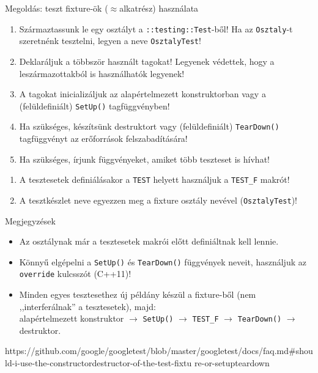 \documentclass[usenames,dvipsnames,aspectratio=169]{beamer}
\newcommand{\kiemel}[1]{{\color{kiemelesszin}#1}}
\begin{document}

\begin{frame}
  Megoldás: teszt \kiemel{fixture}-ök ($\approx$alkatrész) használata
  \begin{enumerate}
    \item Származtassunk le egy osztályt a \texttt{::testing::Test}-ből! Ha az \texttt{Osztaly}-t szeretnénk tesztelni, legyen 
a neve \texttt{OsztalyTest}!
    \item Deklaráljuk a többször használt tagokat! Legyenek védettek, hogy a leszármazottakból is használhatók legyenek!
    \item A tagokat inicializáljuk az alapértelmezett konstruktorban vagy a (felüldefiniált) \texttt{SetUp()} tagfüggvényben!
    \item Ha szükséges, készítsünk destruktort vagy (felüldefiniált) \texttt{TearDown()} tagfüggvényt az 
erőforrások felszabadítására!
    \item Ha szükséges, írjunk függvényeket, amiket több teszteset is hívhat!
    \setcounter{fixtures}{\theenumi}
  \end{enumerate}
\end{frame}

\begin{frame}
  \begin{enumerate}
    \setcounter{enumi}{\thefixtures}
    \item A tesztesetek definiálásakor a \texttt{TEST} helyett használjuk a \texttt{TEST\_F} makrót!
    \item A tesztkészlet neve egyezzen meg a fixture osztály nevével (\texttt{OsztalyTest})!
  \end{enumerate}
  \vfill
  Megjegyzések
  \begin{itemize}
    \item Az osztálynak már a tesztesetek makrói előtt definiáltnak kell lennie.
    \item Könnyű elgépelni a \texttt{SetUp()} és \texttt{TearDown()} függvények neveit, használjuk az \texttt{override} 
kulcsszót (C++11)!
    \item Minden egyes tesztesethez új példány készül a fixture-ből (nem ,,interferálnak'' a tesztesetek), majd:\\ 
alapértelmezett konstruktor $\to$ \texttt{SetUp()} $\to$ \texttt{TEST\_F} $\to$ \texttt{TearDown()} $\to$ destruktor.
  \end{itemize}
\end{frame}

% 
https://github.com/google/googletest/blob/master/googletest/docs/faq.md#should-i-use-the-constructordestructor-of-the-test-fixtu 
re-or-setupteardown
\end{document}
